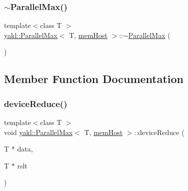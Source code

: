 \mbox{\label{classyakl_1_1ParallelMax_3_01T_00_01memHost_01_4_a9308aaa172385bbcdee38e71d6420b8c}} 
\subsubsection{\texorpdfstring{$\sim$\+Parallel\+Max()}{~ParallelMax()}}
{\footnotesize\ttfamily template$<$class T $>$ \\
\hyperlink{classyakl_1_1ParallelMax}{yakl\+::\+Parallel\+Max}$<$ T, \hyperlink{namespaceyakl_aae8a8c910fec7cef7db68c9658c16405}{mem\+Host} $>$\+::$\sim$\hyperlink{classyakl_1_1ParallelMax}{Parallel\+Max} (\begin{DoxyParamCaption}{ }\end{DoxyParamCaption})\hspace{0.3cm}{\ttfamily [inline]}}



\subsection{Member Function Documentation}
\mbox{\label{classyakl_1_1ParallelMax_3_01T_00_01memHost_01_4_ac71cce8cf77cb508988d34c80b96fc96}} 
\subsubsection{\texorpdfstring{device\+Reduce()}{deviceReduce()}}
{\footnotesize\ttfamily template$<$class T $>$ \\
void \hyperlink{classyakl_1_1ParallelMax}{yakl\+::\+Parallel\+Max}$<$ T, \hyperlink{namespaceyakl_aae8a8c910fec7cef7db68c9658c16405}{mem\+Host} $>$\+::device\+Reduce (\begin{DoxyParamCaption}\item[{T $\ast$}]{data,  }\item[{T $\ast$}]{rslt }\end{DoxyParamCaption})\hspace{0.3cm}{\ttfamily [inline]}}

